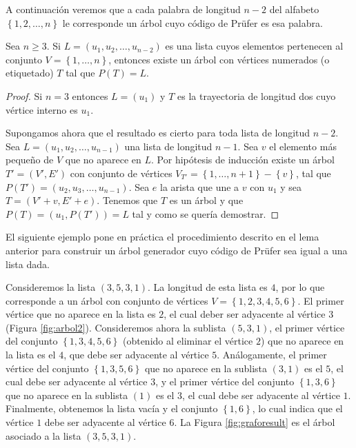 A continuación veremos que a cada palabra de longitud $n-2$ del alfabeto $\left\lbrace 1,2,\dots,n \right\rbrace$ le corresponde un árbol cuyo código de Prüfer es esa palabra.

\begin{proposition}\label{prop:3}
Sea $n \geq 3$. Si $L = (u_1,u_2,\dots,u_{n-2})$ es una lista cuyos elementos pertenecen al conjunto $V = \left\lbrace 1,\dots,n\right\rbrace$, entonces existe un árbol con vértices numerados (o etiquetado) $T$ tal que $P(T) = L$.
\end{proposition}

\begin{proof}
Si $n=3$ entonces $L = (u_1)$ y $T$ es la trayectoria de longitud dos cuyo vértice interno es $u_1$.

Supongamos ahora que el resultado es cierto para toda lista de longitud $n-2$. Sea $L = (u_1,u_2,\dots,u_{n-1})$ una lista de longitud $n-1$. Sea $v$ el elemento más pequeño de $V$ que no aparece en $L$. Por hipótesis de inducción existe un árbol $T' = (V',E')$ con conjunto de vértices $V_{T'} = \left\lbrace 1,\dots,n+1 \right\rbrace - \left\lbrace v \right\rbrace$, tal que $P(T') = (u_2,u_3,\dots,u_{n-1})$. Sea $e$ la arista que une a $v$ con $u_1$ y sea $T = (V' + v, E' + e)$. Tenemos que $T$ es un árbol y que $P(T) = (u_1,P(T')) = L$ tal y como se quería demostrar.
\end{proof}

El siguiente ejemplo pone en práctica el procedimiento descrito en el lema anterior para construir un árbol generador cuyo código de Prüfer sea igual a una lista dada.

\begin{exampleth}
Consideremos la lista $(3,5,3,1)$. La longitud de esta lista es $4$, por lo que corresponde a un árbol con conjunto de vértices $V = \left\lbrace 1,2,3,4,5,6 \right\rbrace$. El primer vértice que no aparece en la lista es $2$, el cual deber ser adyacente al vértice $3$ (Figura \ref{fig:arbol2}). Consideremos ahora la sublista $(5,3,1)$, el primer vértice del conjunto $\left\lbrace 1,3,4,5,6 \right\rbrace$ (obtenido al eliminar el vértice $2$) que no aparece en la lista es el $4$, que debe ser adyacente al vértice $5$. Análogamente, el primer vértice del conjunto $\left\lbrace 1,3,5,6 \right\rbrace$ que no aparece en la sublista $(3,1)$ es el $5$, el cual debe ser adyacente al vértice $3$, y el primer vértice del conjunto $\left\lbrace 1,3,6 \right\rbrace$ que no aparece en la sublista $(1)$ es el $3$, el cual debe ser adyacente al vértice $1$. Finalmente, obtenemos la lista vacía y el conjunto $\left\lbrace 1,6 \right\rbrace$, lo cual indica que el vértice $1$ debe ser adyacente al vértice $6$. La Figura \ref{fig:graforesult} es el árbol asociado a la lista $(3,5,3,1)$.
\end{exampleth}

